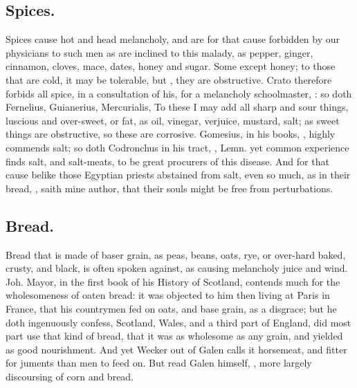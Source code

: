 \subsection{Spices.}
Spices cause hot and head melancholy, and are for that cause forbidden by our
physicians to such men as are inclined to this malady, as pepper, ginger,
cinnamon, cloves, mace, dates, \etc{} honey and sugar.
Some except honey; to those that are cold, it may be
tolerable, but , they are obstructive. Crato therefore forbids all spice, in a
consultation of his, for a melancholy schoolmaster, : so doth Fernelius,  Guianerius,  Mercurialis,
 To these I may add all sharp and sour things,
luscious and over-sweet, or fat, as oil, vinegar, verjuice, mustard, salt; as
sweet things are obstructive, so these are corrosive. Gomesius, in his books,
, highly commends salt; so doth
Codronchus in his tract, , Lemn.
 yet common experience
finds salt, and salt-meats, to be great procurers of this disease. And for that
cause belike those Egyptian priests abstained from salt, even so much, as in
their bread, , saith mine author, that
their souls might be free from perturbations.

\subsection{Bread.}

Bread that is made of baser grain, as peas, beans, oats, rye, or
over-hard baked, crusty, and black, is often spoken
against, as causing melancholy juice and wind. Joh. Mayor, in the first book of
his History of Scotland, contends much for the wholesomeness of oaten bread: it
was objected to him then living at Paris in France, that his countrymen fed on
oats, and base grain, as a disgrace; but he doth ingenuously confess, Scotland,
Wales, and a third part of England, did most part use that kind of bread, that
it was as wholesome as any grain, and yielded as good nourishment. And yet
Wecker out of Galen calls it horsemeat, and fitter for juments than men to feed
on. But read Galen himself, , more largely discoursing of corn and bread.

